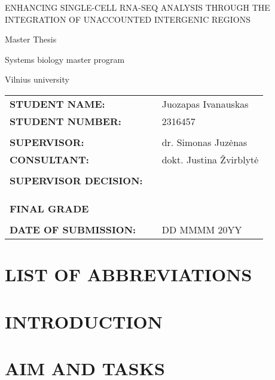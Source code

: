 \documentclass[11pt]{report}
\begin{document}
\begin{titlepage}
  \centering
  \vspace*{3cm}
  {\fontsize{16pt}{24pt}\selectfont ENHANCING SINGLE-CELL RNA-SEQ ANALYSIS THROUGH THE INTEGRATION OF UNACCOUNTED INTERGENIC REGIONS\par}
  {\fontsize{12pt}{24pt}\selectfont Master Thesis\par}
  {\fontsize{12pt}{24pt}\selectfont Systems biology master program\par}
  {\fontsize{12pt}{24pt}\selectfont Vilnius university\par}
  \vspace*{5cm}
  \begin{tabular}{@{}lll@{}}
    \textbf{STUDENT NAME:} & \hspace{3cm} & Juozapas Ivanauskas \\
    \textbf{STUDENT NUMBER:} & & 2316457 \\
    \\
    \textbf{SUPERVISOR:} & & dr. Simonas Juzėnas \\
    \textbf{CONSULTANT:} & & dokt. Justina Žvirblytė \\
    \\
    \textbf{SUPERVISOR DECISION:} & & \dotfill \\
    \\
    \\
    \\
    \textbf{FINAL GRADE} & & \dotfill \\
    \\
    \textbf{DATE OF SUBMISSION:} & & DD MMMM 20YY \\
  \end{tabular}

\end{titlepage}

\tableofcontents

\chapter{LIST OF ABBREVIATIONS}


\chapter{INTRODUCTION}


\chapter{AIM AND TASKS}

\end{document}
